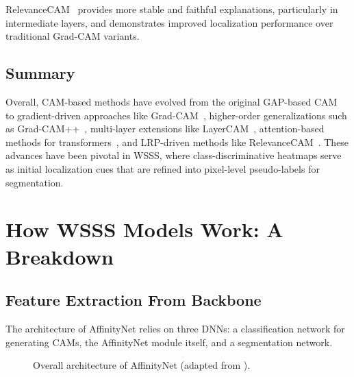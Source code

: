 RelevanceCAM~\cite{relevance_cam} provides more stable and faithful explanations, particularly in intermediate layers, and demonstrates improved localization performance over traditional Grad-CAM variants.

\subsection{Summary}
Overall, CAM-based methods have evolved from the original GAP-based CAM~\cite{cam} to gradient-driven approaches like Grad-CAM~\cite{cam_grad}, higher-order generalizations such as Grad-CAM++~\cite{cam_gradpp}, multi-layer extensions like LayerCAM~\cite{layer_cam}, attention-based methods for transformers~\cite{attention_rollout}, and LRP-driven methods like RelevanceCAM~\cite{relevance_cam}. These advances have been pivotal in WSSS, where class-discriminative heatmaps serve as initial localization cues that are refined into pixel-level pseudo-labels for segmentation.

\section{How WSSS Models Work: A Breakdown}
\label{sec:how-wsss-models-work}

\subsection{Feature Extraction From Backbone}
\label{subsec:feature-extraction-backbone}

The architecture of AffinityNet \cite{wsss_affinitynet} relies on three DNNs: a classification network for generating CAMs, the AffinityNet module itself, and a segmentation network. 
\begin{figure}[htbp]
    \centering
    \caption{Overall architecture of AffinityNet (adapted from \cite{wsss_affinitynet}).}
    \label{fig:affinitynet}
\end{figure}

